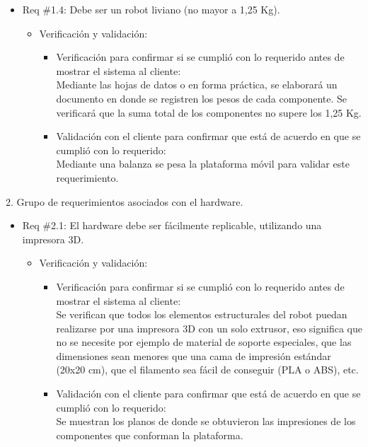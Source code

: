 \documentclass[11pt]{charter}
\begin{document}
\begin{itemize}
\item Req \#1.4: Debe ser un robot liviano (no mayor a 1,25 Kg).
\begin{itemize} 
\item Verificación y validación:
	\begin{itemize}
	\item Verificación para confirmar si se cumplió con lo requerido 	antes de mostrar el sistema al cliente:\\
	Mediante las hojas de datos o en forma práctica, se elaborará un
	documento en donde se registren los pesos de cada componente. Se
	verificará que la suma total de los componentes no supere los
	1,25 Kg.
	\item Validación con el cliente para confirmar que está de 				acuerdo en que se cumplió con lo requerido:\\
	Mediante una balanza se pesa la plataforma móvil para validar
	este requerimiento.  
	\end{itemize}
\end{itemize}
\end{itemize}

2. Grupo de requerimientos asociados con el hardware.

\begin{itemize}
\item Req \#2.1: El hardware debe ser fácilmente replicable, utilizando una impresora 3D.
\begin{itemize}
\item Verificación y validación:
	\begin{itemize}
	\item Verificación para confirmar si se cumplió con lo requerido 	antes de mostrar el sistema al cliente:\\
	Se verifican que todos los elementos estructurales del
 	robot puedan realizarse por una impresora 3D con un solo 
 	extrusor, eso significa que no se necesite por ejemplo de
 	material de soporte	especiales, que las dimensiones sean
 	menores que una cama de impresión estándar (20x20 cm), 
 	que el filamento sea fácil de conseguir (PLA o ABS), etc.
	\item Validación con el cliente para confirmar que está de 				acuerdo en que se cumplió con lo requerido:\\
	Se muestran los planos de donde se obtuvieron las impresiones de 
	los componentes  que conforman la plataforma.    
	\end{itemize}
\end{itemize}
\end{itemize}
\end{document}
